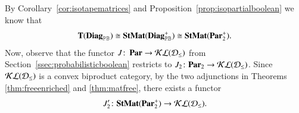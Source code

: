 \medskip

By Corollary~\ref{cor:isotapematrices} and Proposition~\ref{prop:isopartialboolean}  we know that 
\begin{equation}\label{eq:i2so}
  \mathbf{T}(\mathbf{Diag}_{\mathbb{PB}}) \cong \mathbf{StMat}(\mathbf{Diag}_{\mathbb{PB}}^+)\cong \mathbf{StMat}(\mathbf{Par}_2^+)\text{.}
\end{equation}
%
Now, observe that the functor $J\colon \,\mathbf{Par} \to \mathcal{KL}(\mathcal{D}_{\leq})$ from Section~\ref{ssec:probabilisticboolean} restricts to $J_2\colon \mathbf{Par}_2 \to \mathcal{KL}(\mathcal{D}_{\leq})$. Since $\mathcal{KL}(\mathcal{D}_{\leq})$ is a convex biproduct category, by the two adjunctions in Theorems~ \ref{thm:freeenriched} and \ref{thm:matfree}, there exists a functor \[J_2'\colon \mathbf{StMat}(\mathbf{Par}_2^+) \to \mathcal{KL}(\mathcal{D}_{\leq})\text{.} \]


